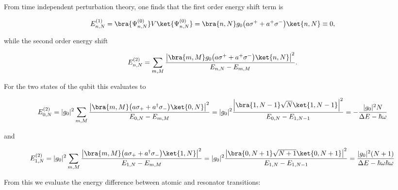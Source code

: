 \noindent From  time independent perturbation theory,  one finds that
the first order energy shift term is

\begin{equation}\label{sec1st}
  E_{n,N}^{(1)} = \bra{\Psi^{(0)}_{n,N}}V\ket{\Psi^{(0)}_{n,N}} = \bra{n,N}g_0\big(a\sigma^{+}+a^{+}\sigma^{-}\big)\ket{n,N} \equiv 0,
\end{equation}

\noindent while the second order energy shift

\begin{equation}\label{sec2nd}
  E_{n,N}^{(2)} = \sum_{m,M}\frac{\left|\bra{m,M}g_0\big(a\sigma^{+}+a^{+}\sigma^{-}\big)\ket{n,N}\right|^2}{E_{n,N}-E_{m,M}}.
\end{equation}

\noindent For the two states of the qubit this evaluates to

\begin{equation}\label{sec0}
  E_{0,N}^{(2)} = |g_0|^2\sum_{m,M}\frac{\left|\bra{m,M}\big(a\sigma_{+}+a^{\dagger}\sigma_{-}\big)\ket{0,N}\right|^2}{E_{0,N}-E_{m,M}}= |g_0|^2\frac{\left|\bra{1,N-1}\sqrt{N}\ket{1,N-1}\right|^2}{E_{0,N}-E_{1,N-1}} = -\frac{|g_0|^2N}{\Delta E - \hbar\omega}
\end{equation}

\noindent and

\begin{equation}\label{sec1}
  E_{1,N}^{(2)} = |g_0|^2\sum_{m,M}\frac{\left|\bra{m,M}\big({a\sigma_{+}}+a^{\dagger}\sigma_{-}\big)\ket{1,N}\right|^2}{E_{1,N}-E_{m,M}}= |g_0|^2\frac{\left|\bra{0,N+1}\sqrt{N+1}\ket{0,N+1}\right|^2}{E_{1,N}-E_{1,N-1}} = \frac{|g_0|^2(N+1)}{\Delta E - \hbar\omega \hbar\omega}
\end{equation}

\noindent From this we evaluate  the energy difference between atomic
and resonator transitions:

